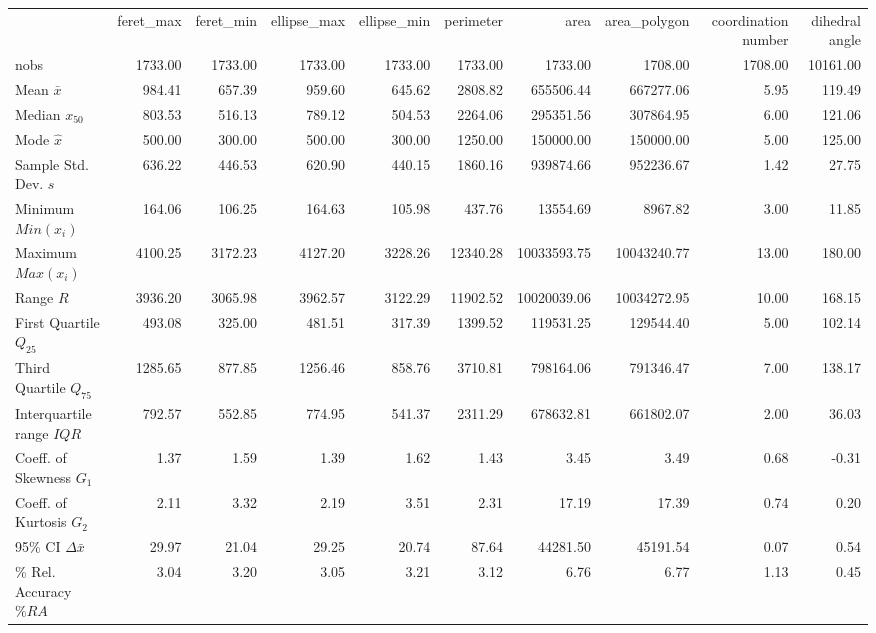 \begin{tabular}{lrrrrrrrrr}
 & feret_max & feret_min & ellipse_max & ellipse_min & perimeter & area & area_polygon & coordination number & dihedral angle \\
nobs & 1733.00 & 1733.00 & 1733.00 & 1733.00 & 1733.00 & 1733.00 & 1708.00 & 1708.00 & 10161.00 \\
Mean $\bar{x}$ & 984.41 & 657.39 & 959.60 & 645.62 & 2808.82 & 655506.44 & 667277.06 & 5.95 & 119.49 \\
Median $x_{50}$ & 803.53 & 516.13 & 789.12 & 504.53 & 2264.06 & 295351.56 & 307864.95 & 6.00 & 121.06 \\
Mode $\hat{x}$ & 500.00 & 300.00 & 500.00 & 300.00 & 1250.00 & 150000.00 & 150000.00 & 5.00 & 125.00 \\
Sample Std. Dev. $s$ & 636.22 & 446.53 & 620.90 & 440.15 & 1860.16 & 939874.66 & 952236.67 & 1.42 & 27.75 \\
Minimum $Min(x_i)$ & 164.06 & 106.25 & 164.63 & 105.98 & 437.76 & 13554.69 & 8967.82 & 3.00 & 11.85 \\
Maximum $Max(x_i)$ & 4100.25 & 3172.23 & 4127.20 & 3228.26 & 12340.28 & 10033593.75 & 10043240.77 & 13.00 & 180.00 \\
Range $R$ & 3936.20 & 3065.98 & 3962.57 & 3122.29 & 11902.52 & 10020039.06 & 10034272.95 & 10.00 & 168.15 \\
First Quartile $Q_{25}$ & 493.08 & 325.00 & 481.51 & 317.39 & 1399.52 & 119531.25 & 129544.40 & 5.00 & 102.14 \\
Third Quartile $Q_{75}$ & 1285.65 & 877.85 & 1256.46 & 858.76 & 3710.81 & 798164.06 & 791346.47 & 7.00 & 138.17 \\
Interquartile range $IQR$ & 792.57 & 552.85 & 774.95 & 541.37 & 2311.29 & 678632.81 & 661802.07 & 2.00 & 36.03 \\
Coeff. of Skewness $G_1$ & 1.37 & 1.59 & 1.39 & 1.62 & 1.43 & 3.45 & 3.49 & 0.68 & -0.31 \\
Coeff. of Kurtosis $G_2$ & 2.11 & 3.32 & 2.19 & 3.51 & 2.31 & 17.19 & 17.39 & 0.74 & 0.20 \\
95\% CI $\Delta \bar{x}$ & 29.97 & 21.04 & 29.25 & 20.74 & 87.64 & 44281.50 & 45191.54 & 0.07 & 0.54 \\
\% Rel. Accuracy $\%RA$ & 3.04 & 3.20 & 3.05 & 3.21 & 3.12 & 6.76 & 6.77 & 1.13 & 0.45 \\
\end{tabular}
